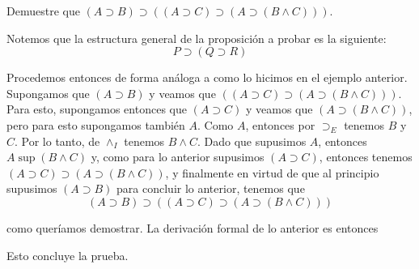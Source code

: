 \documentclass{article}
\begin{document}
\begin{example}\label{example:prop_univ_prod_logica}
    Demuestre que $(A \supset B) \supset ((A \supset C) \supset (A \supset (B \land C)))$. 
    \hfill\newline

    Notemos que la estructura general de la proposición a probar es la siguiente:
    $$
        P \supset (Q \supset R)
    $$

    Procedemos entonces de forma análoga a como lo hicimos en el ejemplo anterior.
    Supongamos que $(A \supset B)$ y veamos que $((A \supset C) \supset (A \supset (B \land C)))$.
    Para esto, supongamos entonces que $(A \supset C)$ y veamos que $(A \supset (B \land C))$,
    pero para esto supongamos también $A$. Como $A$, entonces por $\supset_E$ tenemos $B$ y $C$.
    Por lo tanto, de $\land_I$ tenemos $B \land C$. Dado que supusimos $A$, entonces 
    $A \sup (B \land C)$ y, como para lo anterior supusimos $(A \supset C)$, entonces tenemos
    $(A \supset C) \supset (A \supset (B \land C))$, y finalmente en virtud de que al principio
    supusimos $(A \supset B)$ para concluir lo anterior, tenemos que 
    $$
        (A \supset B) \supset ((A \supset C) \supset (A \supset (B \land C)))
    $$

    como queríamos demostrar.
    La derivación formal de lo anterior es entonces

    \begin{prooftree}
    \end{prooftree}

    Esto concluye la prueba.
\end{example}
\end{document}
